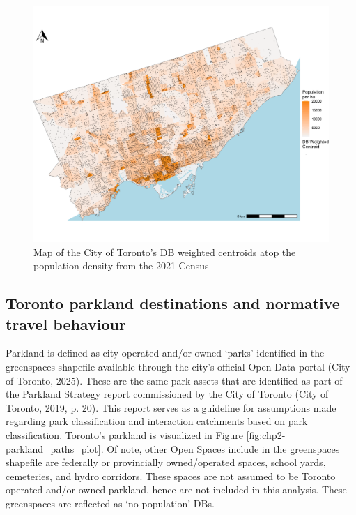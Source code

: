 \documentclass[
11pt, %
oneside, %
english, %
singlespacing, %
]{macthesis} %
\begin{document}
\begin{figure}

{\centering \includegraphics[width=6in]{./data/figures/chp2-toronto_popden_DBCent_plot} 

}

\caption{\label{fig:chp2-toronto_popden_DBCent_plot}Map of the City of Toronto's DB weighted centroids atop the population density from the 2021 Census}\label{fig:unnamed-chunk-7}
\end{figure}

\subsection{Toronto parkland destinations and normative travel behaviour}\label{toronto-parkland-destinations-and-normative-travel-behaviour}

Parkland is defined as city operated and/or owned `parks' identified in the greenspaces shapefile available through the city's official Open Data portal (City of Toronto, 2025). These are the same park assets that are identified as part of the Parkland Strategy report commissioned by the City of Toronto (City of Toronto, 2019, p. 20). This report serves as a guideline for assumptions made regarding park classification and interaction catchments based on park classification. Toronto's parkland is visualized in Figure \ref{fig:chp2-parkland_paths_plot}. Of note, other Open Spaces include in the greenspaces shapefile are federally or provincially owned/operated spaces, school yards, cemeteries, and hydro corridors. These spaces are not assumed to be Toronto operated and/or owned parkland, hence are not included in this analysis. These greenspaces are reflected as `no population' DBs.
\end{document}
